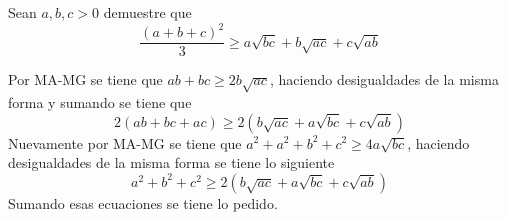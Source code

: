 \documentclass{ayudantia}
\begin{document}
\begin{prob}
    Sean \(a,b,c>0\) demuestre que
    \begin{equation*}
        \frac{(a+b+c)^2}3\geq a\sqrt{bc}+b\sqrt{ac}+c\sqrt{ab}
    \end{equation*}
\end{prob}

\begin{ans}
    \begin{sol}
        Por MA-MG se tiene que \(ab+bc\geq2b\sqrt{ac}\), haciendo desigualdades de la misma forma y sumando se tiene que
        \begin{equation*}
            2(ab+bc+ac)\geq2(b\sqrt{ac}+a\sqrt{bc}+c\sqrt{ab})
        \end{equation*}
        Nuevamente por MA-MG se tiene que \(a^2+a^2+b^2+c^2\geq4a\sqrt{bc}\), haciendo desigualdades de la misma forma se tiene lo siguiente
        \begin{equation*}
            a^2+b^2+c^2\geq2(b\sqrt{ac}+a\sqrt{bc}+c\sqrt{ab})
        \end{equation*}
        Sumando esas ecuaciones se tiene lo pedido.
    \end{sol}
\end{ans}
\end{document}
